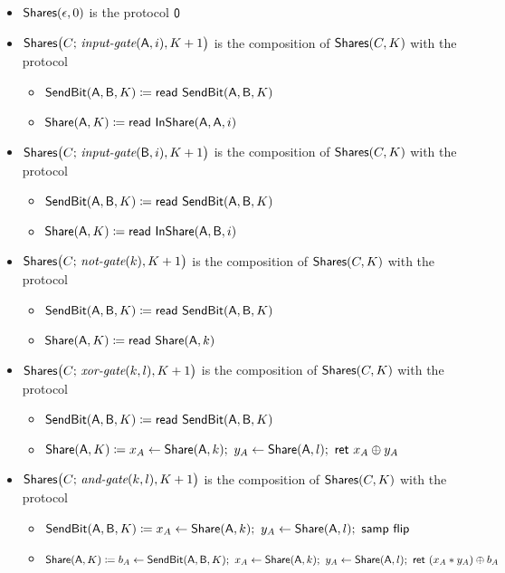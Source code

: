 \begin{itemize}
\item $\mathsf{Shares}(\epsilon,0)$ is the protocol $\mathsf{0}$

\item $\mathsf{Shares}\big(C; \, \textit{input-gate}(\mathsf{A},i),K+1\big)$ is the composition of $\mathsf{Shares}(C,K)$ with the protocol
\begin{itemize}
\item $\mathsf{SendBit}(\mathsf{A},\mathsf{B},K) \coloneqq \mathsf{read} \ \mathsf{SendBit}(\mathsf{A},\mathsf{B},K)$
\item $\mathsf{Share}(\mathsf{A},K) \coloneqq \mathsf{read} \ \mathsf{InShare}(\mathsf{A},\mathsf{A},i)$
\end{itemize}

\item $\mathsf{Shares}\big(C; \, \textit{input-gate}(\mathsf{B},i),K+1\big)$ is the composition of $\mathsf{Shares}(C,K)$ with the protocol
\begin{itemize}
\item $\mathsf{SendBit}(\mathsf{A},\mathsf{B},K) \coloneqq \mathsf{read} \ \mathsf{SendBit}(\mathsf{A},\mathsf{B},K)$
\item $\mathsf{Share}(\mathsf{A},K) \coloneqq \mathsf{read} \ \mathsf{InShare}(\mathsf{A},\mathsf{B},i)$
\end{itemize}

\item $\mathsf{Shares}\big(C; \, \textit{not-gate}(k),K+1\big)$ is the composition of $\mathsf{Shares}(C,K)$ with the protocol
\begin{itemize}
\item $\mathsf{SendBit}(\mathsf{A},\mathsf{B},K) \coloneqq \mathsf{read} \ \mathsf{SendBit}(\mathsf{A},\mathsf{B},K)$
\item $\mathsf{Share}(\mathsf{A},K) \coloneqq \mathsf{read} \ \mathsf{Share}(\mathsf{A},k)$
\end{itemize}

\item $\mathsf{Shares}\big(C; \, \textit{xor-gate}(k,l),K+1\big)$ is the composition of $\mathsf{Shares}(C,K)$ with the protocol
\begin{itemize}
\item $\mathsf{SendBit}(\mathsf{A},\mathsf{B},K) \coloneqq \mathsf{read} \ \mathsf{SendBit}(\mathsf{A},\mathsf{B},K)$
\item $\mathsf{Share}(\mathsf{A},K) \coloneqq x_A \leftarrow \mathsf{Share}(\mathsf{A},k); \ y_A \leftarrow \mathsf{Share}(\mathsf{A},l); \ \mathsf{ret} \ x_A \oplus y_A$
\end{itemize}

\item $\mathsf{Shares}\big(C; \, \textit{and-gate}(k,l),K+1\big)$ is the composition of $\mathsf{Shares}(C,K)$ with the protocol
\begin{itemize}
\item $\SendBit(\A,\B,K) \coloneqq x_A \leftarrow \Share(\A,k); \ y_A \leftarrow \Share(\A,l); \ \samp{\flip}$
\item $\mathsf{Share}(\mathsf{A},K) \coloneqq b_A \leftarrow \mathsf{SendBit}(\mathsf{A},\mathsf{B},K); \ x_A \leftarrow \mathsf{Share}(\mathsf{A},k); \ y_A \leftarrow \mathsf{Share}(\mathsf{A},l); \ \mathsf{ret} \ (x_A * y_A) \oplus b_A$
\end{itemize}
\end{itemize}

